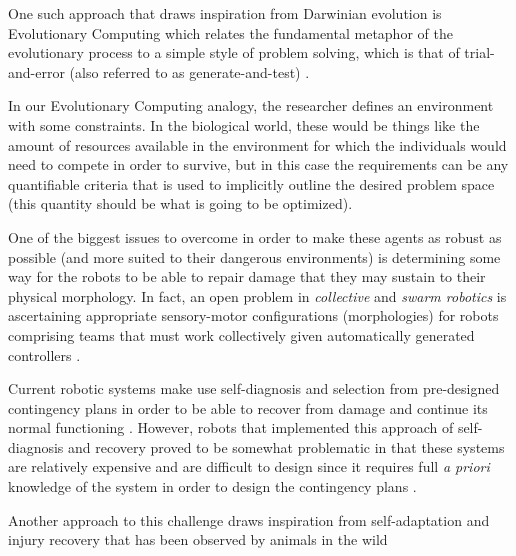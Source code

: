 One such approach that draws inspiration from Darwinian evolution is Evolutionary Computing which relates the fundamental metaphor of the evolutionary process to a simple style of problem solving, which is that of trial-and-error (also referred to as generate-and-test) \cite{RefWorks:33}. 

In our Evolutionary Computing analogy, the researcher defines an environment with some constraints. In the biological world, these would be things like the amount of resources available in the environment for which the individuals would need to compete in order to survive, but in this case the requirements can be any quantifiable criteria that is used to implicitly outline the desired problem space (this quantity should be what is going to be optimized).

One of the biggest issues to overcome in order to make these agents as robust as possible (and more suited to their dangerous environments) is determining some way for the robots to be able to repair damage that they may sustain to their physical morphology. In fact, an open problem in \textit{collective} \cite{KubeZhang1994B} and \textit{swarm robotics} \cite{Beni2004}
is ascertaining appropriate sensory-motor configurations (morphologies) for robots comprising teams that must work collectively given automatically generated controllers \cite{FloreanoDurrMattiussi2008}.

Current robotic systems make use self-diagnosis and selection from pre-designed contingency plans in order to be able to recover from damage and continue its normal functioning \cite{fenton2001fault, verma2004real, BongardZykovLipson2006}. However, robots that implemented this approach of self-diagnosis and recovery proved to be somewhat problematic in that these systems are relatively expensive and are difficult to design since it requires full \textit{a priori} knowledge of the system in order to design the contingency plans \cite{CullyCluneTaraporeMouret2015}.

Another approach to this challenge draws inspiration from self-adaptation and injury recovery that has been observed by animals in the wild






